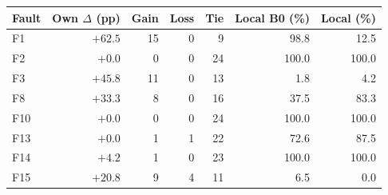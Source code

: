 \begin{tabular}{lrrrrrr}
\toprule
Fault & Own $\Delta$ (pp) & Gain & Loss & Tie & Local B0 (\%) & Local \PROTO{} (\%) \\
\midrule
F1 & $+62.5$ & 15 & 0 & 9 & 98.8 & 12.5 \\
F2 & $+0.0$ & 0 & 0 & 24 & 100.0 & 100.0 \\
F3 & $+45.8$ & 11 & 0 & 13 & 1.8 & 4.2 \\
F8 & $+33.3$ & 8 & 0 & 16 & 37.5 & 83.3 \\
F10 & $+0.0$ & 0 & 0 & 24 & 100.0 & 100.0 \\
F13 & $+0.0$ & 1 & 1 & 22 & 72.6 & 87.5 \\
F14 & $+4.2$ & 1 & 0 & 23 & 100.0 & 100.0 \\
F15 & $+20.8$ & 9 & 4 & 11 & 6.5 & 0.0 \\
\bottomrule
\end{tabular}
